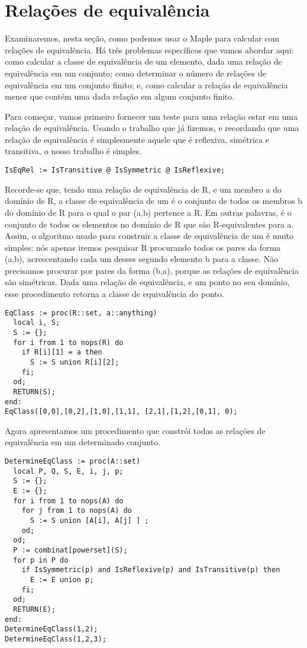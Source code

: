\documentclass[a4paper]{article}
\begin{document}
\section{Relações de equivalência}
Examinaremos, nesta seção, como podemos usar o Maple para calcular com relações de equivalência. Há três problemas específicos que vamos abordar aqui: como calcular a classe de equivalência de um elemento, dada uma relação de equivalência em um conjunto; como determinar o número de relações de equivalência em um conjunto finito; e, como calcular a relação de equivalência menor que contém uma dada relação em algum conjunto finito.

Para começar, vamos primeiro fornecer um teste para uma relação estar em uma relação de equivalência. Usando o trabalho que já fizemos, e recordando que uma relação de equivalência é simplesmente aquele que é reflexiva, simétrica e transitiva, o nosso trabalho é simples.

\begin{lstlisting}
IsEqRel := IsTransitive @ IsSymmetric @ IsReflexive;
\end{lstlisting}

Recorde-se que, tendo uma relação de equivalência de R, e um membro a do domínio de R, a classe de equivalência de um é o conjunto de todos os membros b do domínio de R para o qual o par (a,b) pertence a R. Em outras palavras, é o conjunto de todos os elementos no domínio de R que são R-equivalentes para a. Assim, o algoritmo usado para construir a classe de equivalência de um é muito simples: nós apenas iremos pesquisar R procurando todos os pares da forma (a,b), acrescentando cada um desses segundo elemento b para a classe. Não precisamos procurar por pares da forma (b,a), porque as relações de equivalência são simétricas. Dada uma relação de equivalência, e um ponto no seu domínio, esse procedimento retorna a classe de equivalência do ponto.

\begin{lstlisting}
EqClass := proc(R::set, a::anything)
  local i, S;
  S := {};
  for i from 1 to nops(R) do
    if R[i][1] = a then
      S := S union R[i][2];
    fi;
  od;
  RETURN(S);
end:
EqClass([0,0],[0,2],[1,0],[1,1], [2,1],[1,2],[0,1], 0);
\end{lstlisting}

Agora apresentamos um procedimento que constrói todas as relações de equivalência em um determinado conjunto.

\begin{lstlisting}
DetermineEqClass := proc(A::set)
  local P, Q, S, E, i, j, p;
  S := {};
  E := {};
  for i from 1 to nops(A) do
    for j from 1 to nops(A) do
      S := S union [A[i], A[j] ] ;
    od;
  od;
  P := combinat[powerset](S);
  for p in P do
    if IsSymmetric(p) and IsReflexive(p) and IsTransitive(p) then
      E := E union p;
    fi;
  od;
  RETURN(E);
end:
DetermineEqClass(1,2);
DetermineEqClass(1,2,3);
\end{lstlisting}
\end{document}
